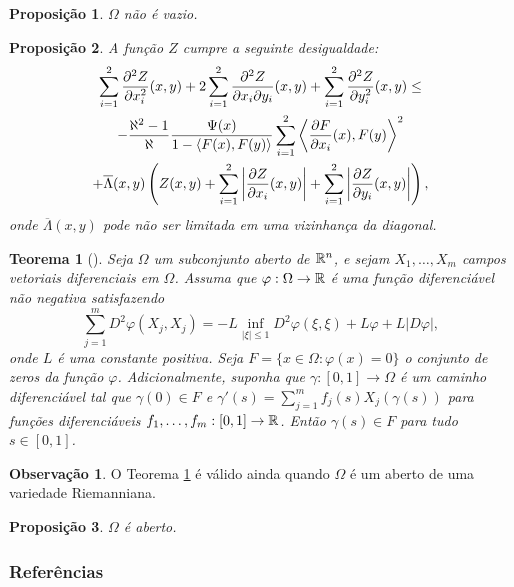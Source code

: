 \documentclass[12pt,a4paper]{beamer}
\newtheorem{teorema}{Teorema}
\newtheorem{proposicao}{Proposição}
\theoremstyle{definition}
\newtheorem{observacao}{Observação}
\begin{document}
\begin{frame}
	\begin{proposicao}
		$\Omega$ não é vazio.
	\end{proposicao}
\end{frame}

\begin{frame}
	\begin{proposicao}
		A função $Z$ cumpre a seguinte desigualdade:
		\begin{multline*}
			\sum_{i=1}^{2} \frac{\partial^2 Z}{\partial x_i^2}(x,y) + 2 \sum_{i=1}^{2} \frac{\partial^2 Z}{\partial x_i \partial y_i}(x,y) + \sum_{i=1}^{2} \frac{\partial^2 Z}{\partial y_i^2}(x,y) \leq \\
			- \frac{\aleph^2 -1}{\aleph} \frac{\Psi(x)}{1 - \left\langle F(x),F(y) \right\rangle} \sum_{i=1}^{2} \left\langle \frac{\partial F}{\partial x_i}(x),F(y) \right\rangle^2 \\ 
			+ \overline{\Lambda}(x,y) \left( Z(x,y) + \sum_{i=1}^{2} \left| \frac{\partial Z}{\partial x_i}(x,y) \right| + \sum_{i=1}^{2} \left| \frac{\partial Z}{\partial y_i}(x,y) \right| \right),
		\end{multline*}
		onde $\overline{\Lambda}(x,y)$ pode não ser limitada em uma vizinhança da diagonal.
	\end{proposicao}
\end{frame}

\begin{frame}
	\begin{teorema}[\cite{Brendle2010}]
		\label{bony's-strict-maximum-principe}
		Seja $\Omega$ um subconjunto aberto de $\mathbb R^n$, e sejam $X_1, \ldots, X_m$ campos vetoriais diferenciais em $\Omega$. Assuma que $\varphi: \Omega \rightarrow \mathbb R$ é uma função diferenciável não negativa satisfazendo
		\begin{equation*}
			\sum_{j=1}^{m} D^2 \varphi (X_j,X_j) = -L \inf_{|\xi| \leq 1} D^2 \varphi(\xi,\xi) + L \varphi + L |D \varphi|,
		\end{equation*}
		onde $L$ é uma constante positiva. Seja $F= \{ x \in \Omega: \varphi(x)=0 \}$ o conjunto de zeros da função $\varphi$. Adicionalmente, suponha que $\gamma: [0,1] \rightarrow \Omega$ é um caminho diferenciável tal que $\gamma(0) \in F$ e $\gamma'(s) = \sum_{j=1}^{m} f_j(s) X_j(\gamma(s))$ para funções diferenciáveis $f_1, \ldots, f_m: [0,1] \rightarrow \mathbb R$. Então $\gamma(s) \in F$ para tudo $s \in [0,1]$.
	\end{teorema}
\end{frame}

\begin{frame}
	\begin{observacao}
		O Teorema \ref{bony's-strict-maximum-principe} é válido ainda quando $\Omega$ é um aberto de uma variedade Riemanniana. 
	\end{observacao}

		\begin{proposicao}
		$\Omega$ é aberto.
	\end{proposicao}
\end{frame}




\begin{frame}
	\frametitle{Referências}
	
\end{frame}
\end{document}
